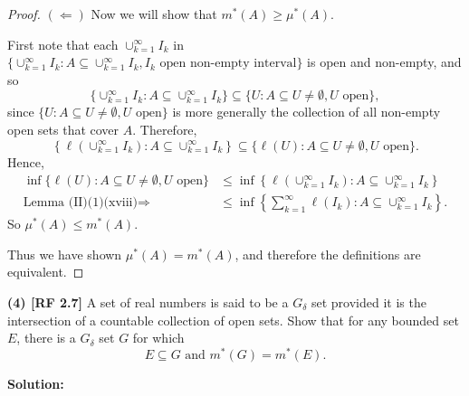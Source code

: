 \documentclass[12pt]{article}
\begin{document}
\begin{proof}
$(\Leftarrow)$ Now we will show that $m^{*}(A) \geq \mu^{*}(A)$.

First note that each $\cup_{k=1}^{\infty}I_{k}$ in
$\{\cup_{k=1}^{\infty}I_{k}: A \subseteq
\cup_{k=1}^{\infty}I_{k}, I_{k}\text{ open non-empty interval}\}$ is open and non-empty, and so 
\[ \{\cup_{k=1}^{\infty}I_{k}: A \subseteq \cup_{k=1}^{\infty}I_{k}\}
\subseteq \{U:A \subseteq U \neq \emptyset, U \text{ open}\},\]
since $\{U:A \subseteq U \neq \emptyset, U \text{ open}\}$ is more generally the collection of all
non-empty open sets that cover $A$. Therefore,
\[ \left\{\ell\left(\cup_{k=1}^{\infty}I_{k}\right): A \subseteq
\cup_{k=1}^{\infty}I_{k}\right\} \subseteq \{\ell(U):A \subseteq U \neq \emptyset, U \text{ open}\}.\]
Hence,
\begin{align*}
\inf\{\ell(U):A \subseteq U \neq \emptyset, U \text{ open}\} & \leq 
\inf\left\{\ell\left(\cup_{k=1}^{\infty}I_{k}\right): A \subseteq
\cup_{k=1}^{\infty}I_{k}\right\} \\
\text{Lemma
(II)(1)(xviii)}\Rightarrow\qquad & \leq \inf\left\{ \sum_{k=1}^{\infty}\ell(I_{k}) : A \subseteq
\cup_{k=1}^{\infty}I_{k}\right\}. 
\end{align*}
So $\mu^{*}(A) \leq m^{*}(A)$.

Thus we have shown $\mu^{*}(A) = m^{*}(A)$, and therefore the definitions are equivalent.
\end{proof}

{\bf (4) [RF 2.7]} A set of real numbers is said to be a $G_{\delta}$ set
provided it is the intersection of a countable collection of open sets. Show
that for any bounded set $E$, there is a $G_{\delta}$ set $G$ for which 
\[ E \subseteq G \text{ and } m^{*}(G) = m^{*}(E). \]

{\bf Solution:}
\end{document}
